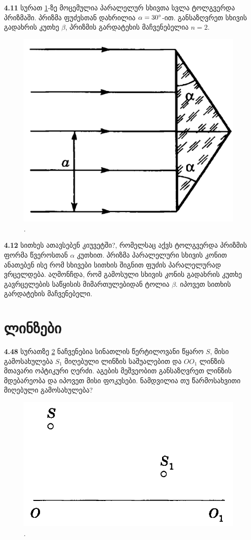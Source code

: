 \documentclass[a4paper]{book}
\begin{document}
\textbf{4.11} სურათ \ref{fig:4_11}-ზე მოცემულია პარალელურ სხივთა სვლა ტოლგვერდა პრიზმაში. პრიზმა ფუძესთან დახრილია $\alpha = 30 \degree$-ით. განსაზღვრეთ სხივის გადახრის კუთხე $\beta$, პრიზმის გარდატეხის მაჩვენებელია $n = 2$.
	\begin{figure}[h]
		   \centering
           \includegraphics[width=0.4\columnwidth]{figures/4_11}
           \caption{.}
           \label{fig:4_11}
        \end{figure}

\textbf{4.12} სითხეს ათავსებენ კიუვეტში?, რომელსაც აქვს ტოლგვერდა პრიზმის ფორმა წვეროსთან $\alpha$ კუთხით. პრიზმა პარალელური სხივის კონით ანათებენ ისე რომ სხივები სითხის შიგნით ფუძის პარალელურად ვრცელდება. აღმონჩდა, რომ გამოსული სხივის კონის გადახრის კუთხე გავრცელების საწყისის მიმართულებიდან ტოლია $\beta$. იპოვეთ სითხის გარდატეხის მაჩვენებელი. 

\section{ლინზები}

\textbf{4.48} სურათზე \ref{fig:4_48} ნაჩვენებია სინათლის წერტილოვანი წყარო $S$, მისი გამოსახულება $S_1$ მიღებული ლინზის საშუალებით და $OO_1$ ლინზის მთავარი ოპტიკური ღერძი. აგების მეშვეობით განსაზღვრეთ ლინზის მდებარეობა და იპოვეთ მისი ფოკუსები. ნამდვილია თუ წარმოსახვითი მიღებული გამოსახულება?
	\begin{figure}[h]
		   \centering
           \includegraphics[width=0.4\columnwidth]{figures/4_48}
           \caption{.}
           \label{fig:4_48}
        \end{figure}
\end{document}
